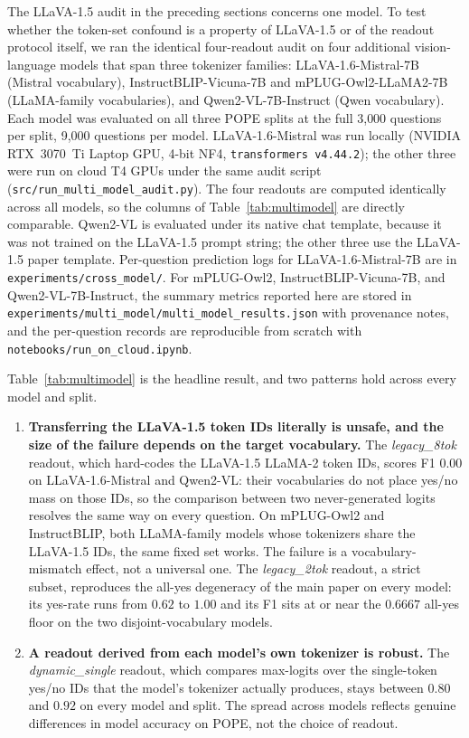 \documentclass[11pt,letterpaper]{article}
\begin{document}
The LLaVA-1.5 audit in the preceding sections concerns one model. To
test whether the token-set confound is a property of LLaVA-1.5 or of
the readout protocol itself, we ran the identical four-readout audit on
four additional vision-language models that span three tokenizer
families: LLaVA-1.6-Mistral-7B (Mistral vocabulary),
InstructBLIP-Vicuna-7B and mPLUG-Owl2-LLaMA2-7B (LLaMA-family
vocabularies), and Qwen2-VL-7B-Instruct (Qwen vocabulary). Each model
was evaluated on all three POPE splits at the full 3{,}000 questions per
split, 9{,}000 questions per model. LLaVA-1.6-Mistral was run locally
(NVIDIA RTX~3070~Ti Laptop GPU, 4-bit NF4,
\texttt{transformers v4.44.2}); the other three were run on cloud T4
GPUs under the same audit script (\texttt{src/run\_multi\_model\_audit.py}).
The four readouts are computed identically across all models, so the
columns of Table~\ref{tab:multimodel} are directly comparable.
Qwen2-VL is evaluated under its native chat template, because it was
not trained on the LLaVA-1.5 prompt string; the other three use the
LLaVA-1.5 paper template. Per-question prediction logs for
LLaVA-1.6-Mistral-7B are in \texttt{experiments/cross\_model/}. For
mPLUG-Owl2, InstructBLIP-Vicuna-7B, and Qwen2-VL-7B-Instruct, the summary
metrics reported here are stored in
\texttt{experiments/multi\_model/multi\_model\_results.json} with
provenance notes, and the per-question records are reproducible from
scratch with \texttt{notebooks/run\_on\_cloud.ipynb}.

Table~\ref{tab:multimodel} is the headline result, and two patterns
hold across every model and split.

\begin{enumerate}[leftmargin=*,nosep]
\item \textbf{Transferring the LLaVA-1.5 token IDs literally is unsafe,
and the size of the failure depends on the target vocabulary.} The
\emph{legacy\_8tok} readout, which hard-codes the LLaVA-1.5 LLaMA-2
token IDs, scores F1 $0.00$ on LLaVA-1.6-Mistral and Qwen2-VL: their
vocabularies do not place yes/no mass on those IDs, so the comparison
between two never-generated logits resolves the same way on every
question. On mPLUG-Owl2 and InstructBLIP, both LLaMA-family models
whose tokenizers share the LLaVA-1.5 IDs, the same fixed set works.
The failure is a vocabulary-mismatch effect, not a universal one.
The \emph{legacy\_2tok} readout, a strict subset, reproduces the
all-yes degeneracy of the main paper on every model: its yes-rate runs
from $0.62$ to $1.00$ and its F1 sits at or near the $0.6667$ all-yes
floor on the two disjoint-vocabulary models.
\item \textbf{A readout derived from each model's own tokenizer is
robust.} The \emph{dynamic\_single} readout, which compares max-logits
over the single-token yes/no IDs that the model's tokenizer actually
produces, stays between $0.80$ and $0.92$ on every model and split.
The spread across models reflects genuine differences in model accuracy
on POPE, not the choice of readout.
\end{enumerate}
\end{document}
